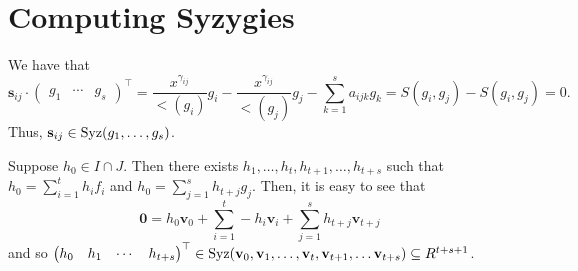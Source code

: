 \documentclass[letterpaper, 11pt, oneside]{book}
\begin{document}
\clearpage

\section{Computing Syzygies}

\begin{sol}\label{ex:UAG_5.3.1}
  We have that
  \[
    \mathbf{s}_{i j} \cdot \begin{pmatrix} g_{1} & \cdots & g_{s} \end{pmatrix}^{\top} = \frac{x^{\gamma_{i j}}}{\lt(g_{i})} g_{i} - \frac{x^{\gamma_{i j}}}{\lt(g_{j})}g_{j} - \sum_{k = 1}^{s} a_{i j k} g_{k} = S(g_{i}, g_{j}) - S(g_{i}, g_{j}) = 0.
  \]
  Thus, $\mathbf{s}_{i j} \in \operatorname{Syz}(g_{1}, \ldots, g_{s})$.
\end{sol}

\begin{sol}\label{ex:UAG_5.3.7}
  Suppose $h_{0} \in I \cap J$.
  Then there exists $h_{1}, \ldots, h_{t}, h_{t + 1}, \ldots, h_{t + s}$ such that $h_{0} = \sum_{i = 1}^{t} h_{i}f_{i}$ and $h_{0} = \sum_{j = 1}^{s} h_{t + j}g_{j}$.
  Then, it is easy to see that
  \[
    \mathbf{0} = h_{0}\mathbf{v}_{0} + \sum_{i = 1}^{t} -h_{i}\mathbf{v}_{i} + \sum_{j = 1}^{s} h_{t + j}\mathbf{v}_{t + j}
  \]
  and so $\begin{pmatrix} h_{0} & h_{1} & \cdots & h_{t + s} \end{pmatrix}^{\top} \in \operatorname{Syz}(\mathbf{v}_{0}, \mathbf{v}_{1}, \ldots, \mathbf{v}_{t}, \mathbf{v}_{t + 1}, \ldots \mathbf{v}_{t + s}) \subseteq R^{t + s + 1}$.
\end{sol}
\end{document}
